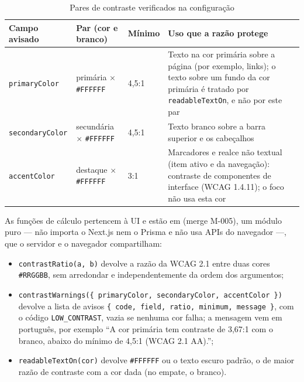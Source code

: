 \begin{table}[htb]
\caption{Pares de contraste verificados na configuração}\label{tab:pares-contraste}
\small
\begin{tabularx}{\linewidth}{@{}L{2.8cm}L{3.6cm}L{1.7cm}Y@{}}
\toprule
\textbf{Campo avisado} & \textbf{Par (cor e branco)} & \textbf{Mínimo} & \textbf{Uso que a razão protege}\\
\midrule
\texttt{primaryColor} & primária $\times$ \texttt{\#FFFFFF} & 4,5:1 & Texto na cor primária sobre a página (por exemplo, links); o texto sobre um fundo da cor primária é tratado por \texttt{readableTextOn}, e não por este par\\
\addlinespace
\texttt{secondaryColor} & secundária $\times$ \texttt{\#FFFFFF} & 4,5:1 & Texto branco sobre a barra superior e os cabeçalhos\\
\addlinespace
\texttt{accentColor} & destaque $\times$ \texttt{\#FFFFFF} & 3:1 & Marcadores e realce não textual (item ativo e  da navegação): contraste de componentes de interface (WCAG 1.4.11); o foco não usa esta cor\\
\bottomrule
\end{tabularx}
\end{table}

As funções de cálculo pertencem à UI e estão em  (merge M-005), um módulo puro --- não importa o Next.js nem o Prisma e não usa APIs do navegador ---, que o servidor e o navegador compartilham:

\begin{itemize}
  \item \texttt{contrastRatio(a, b)} devolve a razão da WCAG 2.1 entre duas cores \texttt{\#RRGGBB}, sem arredondar e independentemente da ordem dos argumentos;
  \item \texttt{contrastWarnings(\{ primaryColor, secondaryColor, accentColor \})} devolve a lista de avisos \texttt{\{ code, field, ratio, minimum, message \}}, com o código \texttt{LOW\_CONTRAST}, vazia se nenhuma cor falha; a mensagem vem em português, por exemplo ``A cor primária tem contraste de 3,67:1 com o branco, abaixo do mínimo de 4,5:1 (WCAG 2.1 AA).'';
  \item \texttt{readableTextOn(cor)} devolve \texttt{\#FFFFFF} ou o texto escuro padrão, o de maior razão de contraste com a cor dada (no empate, o branco).
\end{itemize}

